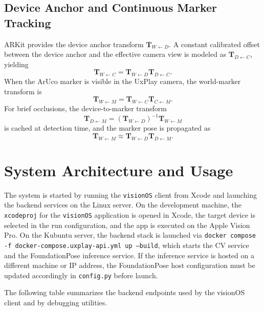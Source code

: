 \subsection{Device Anchor and Continuous Marker Tracking}
\label{app:device_anchor_tracking_full}
ARKit provides the device anchor transform $\mathbf{T}_{W \leftarrow D}$. A constant calibrated offset between the device anchor and the effective camera view is modeled as $\mathbf{T}_{D \leftarrow C}$, yielding
\[
\mathbf{T}_{W \leftarrow C} = \mathbf{T}_{W \leftarrow D}\mathbf{T}_{D \leftarrow C}.
\]
When the ArUco marker is visible in the UxPlay camera, the world-marker transform is
\[
\mathbf{T}_{W \leftarrow M} = \mathbf{T}_{W \leftarrow C}\mathbf{T}_{C \leftarrow M}.
\]
For brief occlusions, the device-to-marker transform
\[
\mathbf{T}_{D \leftarrow M} =
\left(\mathbf{T}_{W \leftarrow D}\right)^{-1}\mathbf{T}_{W \leftarrow M}
\]
is cached at detection time, and the marker pose is propagated as
\[
\mathbf{T}_{W \leftarrow M} \approx \mathbf{T}_{W \leftarrow D}\mathbf{T}_{D \leftarrow M}.
\]

\section{System Architecture and Usage}
\label{app:system_usage}

The system is started by running the \texttt{visionOS} client from Xcode and launching the backend services on the Linux server. On the development machine, the \texttt{xcodeproj} for the \texttt{visionOS} application is opened in Xcode, the target device is selected in the run configuration, and the app is executed on the Apple Vision Pro. On the Kubuntu server, the backend stack is launched via
\texttt{docker compose -f docker-compose.uxplay-api.yml up --build},
which starts the CV service and the FoundationPose inference service. If the inference service is hosted on a different machine or IP address, the FoundationPose host configuration must be updated accordingly in \texttt{config.py} before launch.

The following table summarizes the backend endpoints used by the visionOS client and by debugging utilities.

